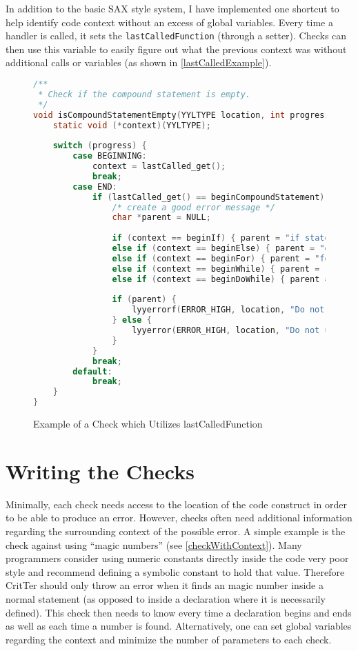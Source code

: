 \documentclass[12pt]{report}
\newcommand{\programName}{CritTer\xspace}
\begin{document}
In addition to the basic SAX style system, I have implemented one shortcut to help identify code context 
without an excess of global variables. Every time a handler is called, it sets the 
\lstinline{lastCalledFunction} (through a setter). Checks can then use this variable to easily figure out 
what the previous context was without additional calls or variables (as shown in 
\autoref{lastCalledExample}).

\begin{figure}
\begin{lstlisting}[language=C]
/**
 * Check if the compound statement is empty.
 */
void isCompoundStatementEmpty(YYLTYPE location, int progress) {
	static void (*context)(YYLTYPE);
	
	switch (progress) {
		case BEGINNING:
			context = lastCalled_get();
			break;
		case END:
			if (lastCalled_get() == beginCompoundStatement) {
				/* create a good error message */
				char *parent = NULL;
				
				if (context == beginIf) { parent = "if statements"; }
				else if (context == beginElse) { parent = "else statements"; }
				else if (context == beginFor) { parent = "for loops"; }
				else if (context == beginWhile) { parent = "while loops"; }
				else if (context == beginDoWhile) { parent = "doWhile loops"; }
				
				if (parent) {
					lyyerrorf(ERROR_HIGH, location, "Do not use empty %s", parent);
				} else {
					lyyerror(ERROR_HIGH, location, "Do not use empty block statements");
				}
			}
			break;
		default:
			break;
	}
}
\end{lstlisting}
\caption{Example of a Check which Utilizes lastCalledFunction}
\label{lastCalledExample}
\end{figure}
\newpage

\section{Writing the Checks}
\label{writingTheChecks}

Minimally, each check needs access to the location of the code construct in order to be able to produce 
an error. However, checks often need additional information regarding the surrounding context of 
the possible error. A simple example is the check against using ``magic 
numbers''\cite[p.~19]{practice-of-programming} (see \autoref{checkWithContext}). Many programmers 
consider using numeric constants directly inside the code very poor style and recommend defining a 
symbolic constant to hold that value. Therefore \programName should only throw an error when it finds 
an magic number inside a normal statement (as opposed to inside a declaration where it is necessarily 
defined). This check then needs to know every time a declaration begins and ends as well as each time 
a number is found. Alternatively, one can set global variables regarding the context and minimize the 
number of parameters to each check.
\end{document}
